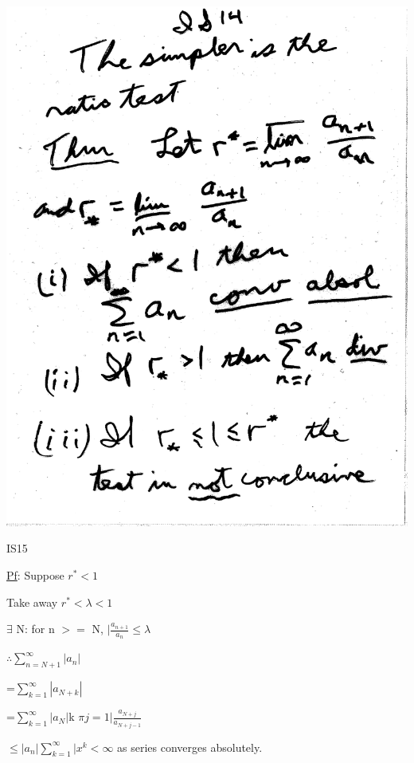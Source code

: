 \documentclass[10pt,a4paper]{article}
\begin{document}
\includegraphics[scale=.5]{Pages/IS_14}

\newpage

\begin{center}
IS15
\end{center}

\underline{Pf}:
Suppose $r^* <1$

Take away $r^* <\lambda <1$

$\exists$ N: for n $>=$ N, $| \frac{a_{n+1}}{a_n} \le \lambda$

$\therefore \sum_{n=N+1}^{\infty}|a_{n}|$

  =$\sum_{k=1}^{\infty}|a_{N+k}|$

  =$\sum_{k=1}^{\infty}|a_{N}|$k $\pi j=1| \frac{a_{N+j}}{a_{N+j-1}}$

  $\le |a_n| \sum_{k=1}^{\infty}|x^k < \infty$ as series converges absolutely.
\end{document}
